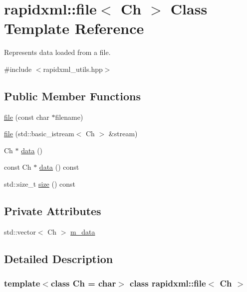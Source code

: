 \hypertarget{classrapidxml_1_1file}{}\section{rapidxml\+::file$<$ Ch $>$ Class Template Reference}
\label{classrapidxml_1_1file}


Represents data loaded from a file.  




{\ttfamily \#include $<$rapidxml\+\_\+utils.\+hpp$>$}

\subsection*{Public Member Functions}
\begin{DoxyCompactItemize}
\item 
\mbox{\hyperlink{classrapidxml_1_1file_ae881a3cab1fe7152d45c92a8d7606cb3}{file}} (const char $\ast$filename)
\item 
\mbox{\hyperlink{classrapidxml_1_1file_a90707ccd991cc392dcf4bef37eed9d1f}{file}} (std\+::basic\+\_\+istream$<$ Ch $>$ \&stream)
\item 
Ch $\ast$ \mbox{\hyperlink{classrapidxml_1_1file_af1c71d65862c7af14e4708e32a80c1de}{data}} ()
\item 
const Ch $\ast$ \mbox{\hyperlink{classrapidxml_1_1file_a044bdd99e59157b8a5a1b28c2f32da4d}{data}} () const
\item 
std\+::size\+\_\+t \mbox{\hyperlink{classrapidxml_1_1file_aacd451b3def3ad056fe8342dccee35cd}{size}} () const
\end{DoxyCompactItemize}
\subsection*{Private Attributes}
\begin{DoxyCompactItemize}
\item 
std\+::vector$<$ Ch $>$ \mbox{\hyperlink{classrapidxml_1_1file_a60c4a72a55bbf4dbcca07f251a09cddf}{m\+\_\+data}}
\end{DoxyCompactItemize}


\subsection{Detailed Description}
\subsubsection*{template$<$class Ch = char$>$\newline
class rapidxml\+::file$<$ Ch $>$}

